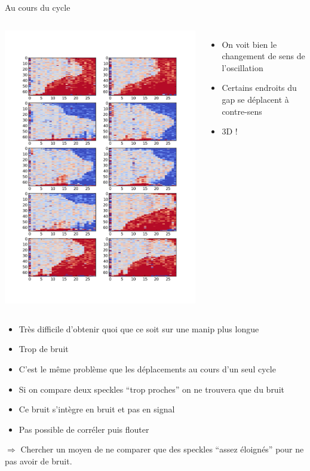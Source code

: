 \documentclass{beamer}
\begin{document}
\begin{frame}{Au cours du cycle}
\begin{columns}
\includegraphics[width=\columnwidth]{irr_av5.png}
\begin{itemize}
\item On voit bien le changement de sens de l'oscillation
\item Certains endroits du gap se déplacent à contre-sens
\item 3D !
\end{itemize}
\end{columns}
\end{frame}

\begin{frame}
\begin{itemize}
\item Très difficile d'obtenir quoi que ce soit sur une manip plus longue
\item Trop de bruit
\item C'est le même problème que les déplacements au cours d'un seul cycle
\item Si on compare deux speckles ``trop proches'' on ne trouvera que du bruit
\item Ce bruit s'intègre en bruit et pas en signal
\item Pas possible de corréler puis flouter
\end{itemize}
$\Rightarrow$ Chercher un moyen de ne comparer que des speckles ``assez éloignés'' pour ne pas avoir de bruit.
\end{frame}
\end{document}
